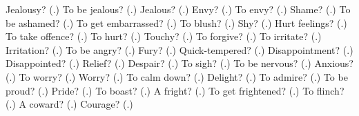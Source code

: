 \begin{tcolorbox}[breakable,colback=teal!4,colframe=teal!35!black,title={Before you move on}]
Jealousy? (\textbf{}.) To be jealous? (\textbf{}.) Jealous? (\textbf{}.) Envy? (\textbf{}.) To envy? (\textbf{}.) Shame? (\textbf{}.) To be ashamed? (\textbf{}.) To get embarrassed? (\textbf{}.) To blush? (\textbf{}.) Shy? (\textbf{}.) Hurt feelings? (\textbf{}.) To take offence? (\textbf{}.) To hurt? (\textbf{}.) Touchy? (\textbf{}.) To forgive? (\textbf{}.) To irritate? (\textbf{}.) Irritation? (\textbf{}.) To be angry? (\textbf{}.) Fury? (\textbf{}.) Quick-tempered? (\textbf{}.) Disappointment? (\textbf{}.) Disappointed? (\textbf{}.) Relief? (\textbf{}.) Despair? (\textbf{}.) To sigh? (\textbf{}.) To be nervous? (\textbf{}.) Anxious? (\textbf{}.) To worry? (\textbf{}.) Worry? (\textbf{}.) To calm down? (\textbf{}.) Delight? (\textbf{}.) To admire? (\textbf{}.) To be proud? (\textbf{}.) Pride? (\textbf{}.) To boast? (\textbf{}.) A fright? (\textbf{}.) To get frightened? (\textbf{}.) To flinch? (\textbf{}.) A coward? (\textbf{}.) Courage? (\textbf{}.)
\end{tcolorbox}
